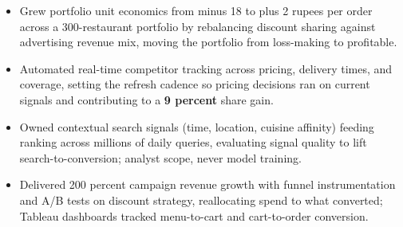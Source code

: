 \documentclass[letterpaper,10pt]{article}
\begin{document}
\begin{itemize}
\item Grew portfolio unit economics from minus 18 to plus 2 rupees per order across a 300-restaurant portfolio by rebalancing discount sharing against advertising revenue mix, moving the portfolio from loss-making to profitable.
\item Automated real-time competitor tracking across pricing, delivery times, and coverage, setting the refresh cadence so pricing decisions ran on current signals and contributing to a \textbf{9 percent} share gain.
\item Owned contextual search signals (time, location, cuisine affinity) feeding ranking across millions of daily queries, evaluating signal quality to lift search-to-conversion; analyst scope, never model training.
\item Delivered 200 percent campaign revenue growth with funnel instrumentation and A/B tests on discount strategy, reallocating spend to what converted; Tableau dashboards tracked menu-to-cart and cart-to-order conversion.
\end{itemize}
\end{document}
